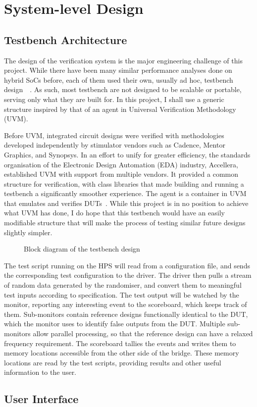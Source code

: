 \section{System-level Design}

\subsection{Testbench Architecture}
The design of the verification system is the major engineering challenge of this project.
While there have been many similar performance analyses done on hybrid SoCs before, each of them used their own, usually ad hoc, testbench design~\cite{Shi1}~\cite{Li1}.
As such, most testbench are not designed to be scalable or portable, serving only what they are built for.
In this project, I shall use a generic structure inspired by that of an agent in Universal Verification Methodology (UVM).

Before UVM, integrated circuit designs were verified with methodologies developed independently by stimulator vendors such as Cadence, Mentor Graphics, and Synopsys.
In an effort to unify for greater efficiency, the standards organisation of the Electronic Design Automation (EDA) industry, Accellera, established UVM with support from multiple vendors.
It provided a common structure for verification, with class libraries that made building and running a testbench a significantly smoother experience.
The agent is a container in UVM that emulates and verifies DUTs~\cite{Accellera1}.
While this project is in no position to achieve what UVM has done, I do hope that this testbench would have an easily modifiable structure that will make the process of testing similar future designs slightly simpler.

\begin{figure}[H]
  \centering
  
  \caption{Block diagram of the testbench design}
  \label{Block}
\end{figure}

The test script running on the HPS will read from a configuration file, and sends the corresponding test configuration to the driver.
The driver then pulls a stream of random data generated by the randomiser, and convert them to meaningful test inputs according to specification.
The test output will be watched by the monitor, reporting any interesting event to the scoreboard, which keeps track of them.
Sub-monitors contain reference designs functionally identical to the DUT, which the monitor uses to identify false outputs from the DUT.
Multiple sub-monitors allow parallel processing, so that the reference design can have a relaxed frequency requirement.
The scoreboard tallies the events and writes them to memory locations accessible from the other side of the bridge.
These memory locations are read by the test scripts, providing results and other useful information to the user.

\subsection{User Interface}


